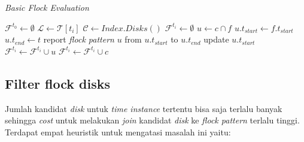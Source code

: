 \begin{algorithm}
\caption{\textit{Basic Flock Evaluation}}
\begin{algorithmic}[1]
\State $\mathcal{F}^{t_0}\gets\emptyset$ 
	\State $\mathcal{L}\gets\mathcal{T}[t_i]$ 
	\State $\mathcal{C}\gets Index.Disks()$ 
	\State $\mathcal{F}^{t_i}\gets\emptyset$ 
		 
				\State $u\gets c\cap f$
					\State $u.t_{start}\gets f.t_{start}$ 
					\State $u.t_{end}\gets t$ 
					 
						\State report \textit{flock pattern} $u$ from $u.t_{start}$ to $u.t_{end}$
						\State update $u.t_{start}$
						\State $\mathcal{F}^{t_i}\gets\mathcal{F}^{t_i}\cup u$ 
					\EndIf
			\EndIf
			\State $\mathcal{F}^{t_i}\gets\mathcal{F}^{t_i}\cup c$ 
		\EndFor
	\EndFor
\EndFor
\end{algorithmic}
\end{algorithm}

\subsection{Filter flock disks}
\par Jumlah kandidat \textit{disk} untuk \textit{time instance} tertentu bisa saja terlalu banyak sehingga \textit{cost} untuk melakukan \textit{join} kandidat \textit{disk} ke \textit{flock pattern} terlalu tinggi. Terdapat empat heuristik untuk mengatasi masalah ini yaitu:

